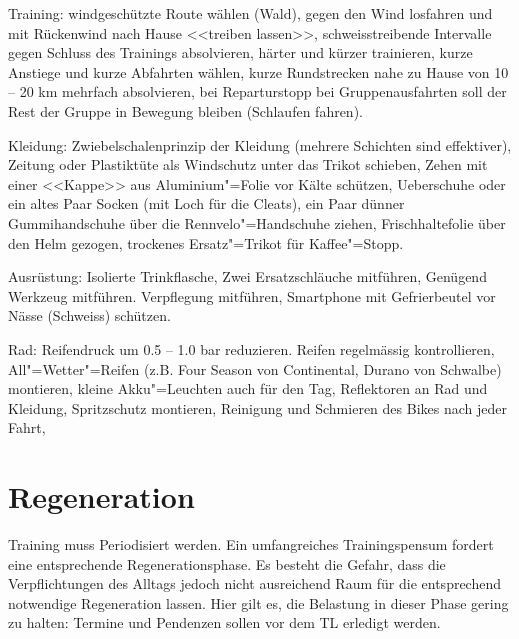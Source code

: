 \documentclass[a4paper,DIV13,BCOR0cm,draft=TRUE]{scrartcl}
\newcommand{\rv}{Rennvelo}
\begin{document}
\begin{itemize*}
        \item Training:
                windgeschützte Route wählen (Wald),
                gegen den Wind losfahren und mit Rückenwind nach Hause <<treiben lassen>>,
                schweisstreibende Intervalle gegen Schluss des Trainings absolvieren,
                härter und kürzer trainieren,
                kurze Anstiege und kurze Abfahrten wählen,
                kurze Rundstrecken nahe zu Hause von 10 -- 20 km mehrfach absolvieren,
                bei Reparturstopp bei Gruppenausfahrten soll der Rest der Gruppe in Bewegung bleiben (Schlaufen fahren).
        \item Kleidung:
                Zwiebelschalenprinzip der Kleidung (mehrere Schichten sind effektiver),
                Zeitung oder Plastiktüte als Windschutz unter das Trikot schieben,
                Zehen mit einer <<Kappe>> aus Aluminium"=Folie vor Kälte schützen,
                Ueberschuhe oder ein altes Paar Socken (mit Loch für die Cleats),
                ein Paar dünner Gummihandschuhe über die \rv"=Handschuhe ziehen,
                Frischhaltefolie über den Helm gezogen,
                trockenes Ersatz"=Trikot für Kaffee"=Stopp.
        \item Ausrüstung:
                Isolierte Trinkflasche,
                Zwei Ersatzschläuche mitführen,
                Genügend Werkzeug mitführen.
                Verpflegung mitführen,
                Smartphone mit Gefrierbeutel vor Nässe (Schweiss) schützen.
        \item Rad:
                Reifendruck um 0.5 -- 1.0 bar reduzieren.
                Reifen regelmässig kontrollieren,
                All"=Wetter"=Reifen (z.B. Four Season von Continental, Durano von Schwalbe) montieren,
                kleine Akku"=Leuchten auch für den Tag,
                Reflektoren an Rad und Kleidung,
                Spritzschutz montieren,
                Reinigung und Schmieren des Bikes nach jeder Fahrt,

\end{itemize*}

\section{Regeneration}

Training muss Periodisiert werden. Ein umfangreiches Trainingspensum fordert eine entsprechende Regenerationsphase.
Es besteht die Gefahr, dass die Verpflichtungen des Alltags jedoch nicht ausreichend Raum für die entsprechend notwendige Regeneration lassen.
Hier gilt es, die Belastung in dieser Phase gering zu halten: Termine und Pendenzen sollen vor dem TL erledigt werden.
\end{document}
